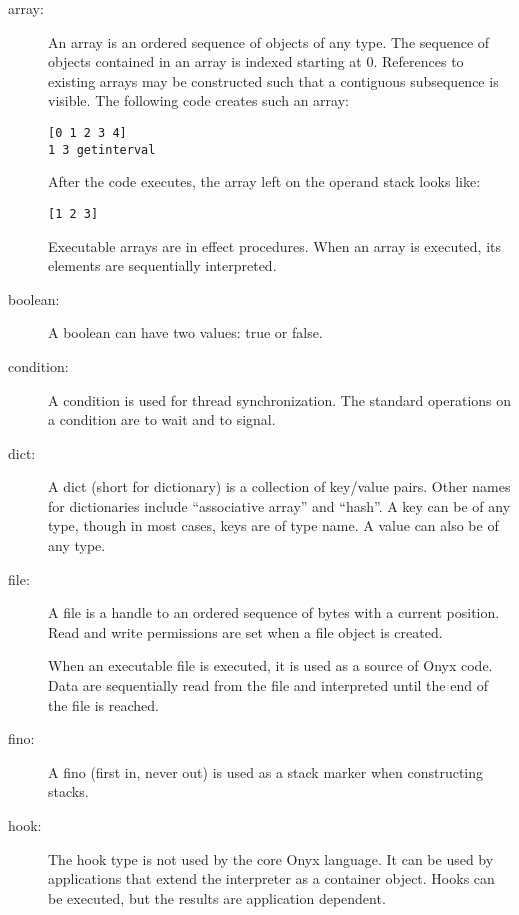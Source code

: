 \begin{description}

\item[array: ] An array is an ordered sequence of objects of any type.  The
sequence of objects contained in an array is indexed starting at 0.  References
to existing arrays may be constructed such that a contiguous subsequence is
visible.  The following code creates such an array:

\begin{verbatim}
[0 1 2 3 4]
1 3 getinterval
\end{verbatim}

After the code executes, the array left on the operand stack looks like:

\begin{verbatim}
[1 2 3]
\end{verbatim}

Executable arrays are in effect procedures.  When an array is executed, its
elements are sequentially interpreted.

\item[boolean: ] A boolean can have two values: true or false.

\item[condition: ] A condition is used for thread synchronization.  The standard
operations on a condition are to wait and to signal.

\item[dict: ] A dict (short for dictionary) is a collection of key/value pairs.
Other names for dictionaries include ``associative array'' and ``hash''.  A key
can be of any type, though in most cases, keys are of type name.  A value can
also be of any type.

\item[file: ] A file is a handle to an ordered sequence of bytes with a current
position.  Read and write permissions are set when a file object is created.

When an executable file is executed, it is used as a source of Onyx code.  Data
are sequentially read from the file and interpreted until the end of the file is
reached.

\item[fino: ] A fino (first in, never out) is used as a stack marker when
constructing stacks.

\item[hook: ] The hook type is not used by the core Onyx language.  It can be
used by applications that extend the interpreter as a container object.  Hooks
can be executed, but the results are application dependent.


\end{description}
